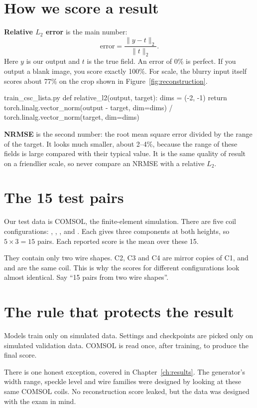 \section{How we score a result}\label{sec:score}

\textbf{Relative $L_2$ error} is the main number:
\begin{equation}
\text{error} = \frac{\lVert y - t \rVert_2}{\lVert t \rVert_2}.
\end{equation}
Here $y$ is our output and $t$ is the true field. An error of 0\% is perfect. If you output a
blank image, you score exactly 100\%. For scale, the blurry input itself scores about 77\% on the
crop shown in Figure~\ref{fig:reconstruction}.

\begin{code*}{train_csc_lista.py}
def relative_l2(output, target):
    dims = (-2, -1)
    return torch.linalg.vector_norm(output - target, dim=dims) / torch.linalg.vector_norm(target, dim=dims)
\end{code*}

\textbf{NRMSE} is the second number: the root mean square error divided by the range of the
target. It looks much smaller, about 2--4\%, because the range of these fields is large compared
with their typical value. It is the same quality of result on a friendlier scale, so never
compare an NRMSE with a relative $L_2$.

\section{The 15 test pairs}

Our test data is COMSOL, the finite-element simulation. There are five coil configurations:
, , ,  and . Each gives
three components at both heights, so $5\times3=15$ pairs. Each reported score is the mean over
these 15.

\begin{careful}
They contain only two wire shapes. C2, C3 and C4 are mirror copies of C1, and
 and  are the same coil. This is why the scores for different
configurations look almost identical. Say ``15 pairs from two wire shapes''.
\end{careful}

\section{The rule that protects the result}

\begin{keyidea}
Models train only on simulated data. Settings and checkpoints are picked only on simulated
validation data. COMSOL is read once, after training, to produce the final score.
\end{keyidea}

There is one honest exception, covered in Chapter~\ref{ch:results}. The generator's width range,
speckle level and wire families were designed by looking at these same COMSOL coils. No
reconstruction score leaked, but the data was designed with the exam in mind.
